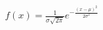 \documentclass[preview]{standalone}
\begin{document}
\begin{align*}
f(x) = \frac{1}{\sigma\sqrt{2\pi}} e^{-\frac{(x-\mu)^2}{2\sigma^2}}
\end{align*}
\end{document}
